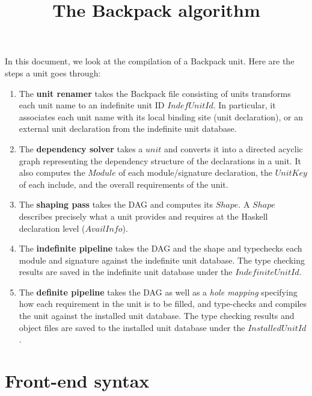 \documentclass{article}
\title{The Backpack algorithm}
\newcommand{\I}[1]{\ensuremath{\mathit{#1}}}
\begin{document}
\maketitle

\noindent
In this document, we look at the compilation of a Backpack unit.
Here are the steps a unit goes through:

\begin{enumerate}
    \item The \textbf{unit renamer} takes the Backpack file consisting
    of units transforms each unit name to an indefinite unit ID \I{IndefUnitId}.
    In particular, it associates each unit name with its local binding
    site (unit declaration), or an external unit declaration from
    the indefinite unit database.

    \item The \textbf{dependency solver} takes a \I{unit}
    and converts it into a
    directed acyclic graph representing the
    dependency structure of the declarations in a unit.
    It also computes the \I{Module} of each module/signature
    declaration, the \I{UnitKey} of each include, and the overall
    requirements of the unit.

    \item The \textbf{shaping pass} takes the DAG
    and computes its \I{Shape}.  A \I{Shape} describes precisely what
    a unit provides and requires at the Haskell declaration level (\I{AvailInfo}).

    \item The \textbf{indefinite pipeline} takes the DAG and the shape
    and typechecks each module and signature against the indefinite unit
    database.  The type checking results are saved in the indefinite
    unit database under the \I{IndefiniteUnitId}.

    \item The \textbf{definite pipeline} takes the DAG as well as a
    \emph{hole mapping} specifying how each requirement in the unit
    is to be filled, and type-checks and compiles the unit against the
    installed unit database.  The type checking results and object files
    are saved to the installed unit database under the \I{InstalledUnitId}.
\end{enumerate}

\section{Front-end syntax}
\end{document}

